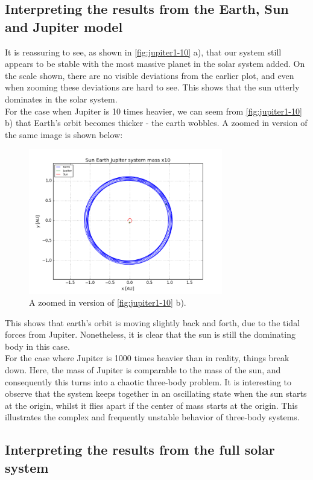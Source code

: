 \documentclass[a4paper, 10pt]{article}
\begin{document}
\subsection{Interpreting the results from the Earth, Sun and Jupiter model}
It is reassuring to see, as shown in \cref{fig:jupiter1-10} a), that our system still appears to be stable with the most massive planet in the solar system added. On the scale shown, there are no visible deviations from the earlier plot, and even when zooming these deviations are hard to see. This shows that the sun utterly dominates in the solar system.\\
\linebreak
For the case when Jupiter is 10 times heavier, we can seem from \cref{fig:jupiter1-10} b) that Earth's orbit becomes thicker - the earth wobbles. A zoomed in version of the same image is shown below:
\begin{figure}[!ht]
    \centering
    \includegraphics[height=2.5in]{orbitESJ10Close.png}
    \caption{A zoomed in version of \cref{fig:jupiter1-10} b).}
\end{figure}
\linebreak
This shows that earth's orbit is moving slightly back and forth, due to the tidal forces from Jupiter. Nonetheless, it is clear that the sun is still the dominating body in this case.\\
\linebreak
For the case where Jupiter is 1000 times heavier than in reality, things break down. Here, the mass of Jupiter is comparable to the mass of the sun, and consequently this turns into a chaotic three-body problem. It is interesting to observe that the system keeps together in an oscillating state when the sun starts at the origin, whilst it flies apart if the center of mass starts at the origin. This illustrates the complex and frequently unstable behavior of three-body systems. 
\subsection{Interpreting the results from the full solar system}
\end{document}
